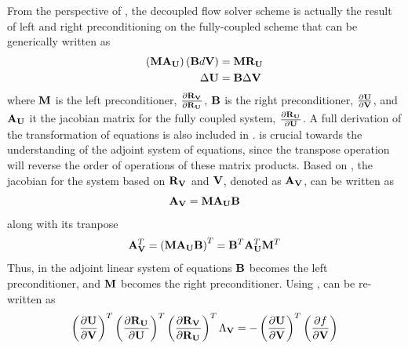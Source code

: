 From the perspective of , the decoupled flow solver scheme
is actually the result of left and right preconditioning on the fully-coupled
scheme that can be generically written as
\begin{equation}
  \begin{aligned}
    \left(\mathbf M \mathbf A_{\mathbf U} \right) \left( \mathbf B d\mathbf V \right) &= \mathbf M \mathbf R_{{\mathbf U}_{}} \\
    \Delta \mathbf U &= \mathbf B \Delta \mathbf V
  \end{aligned}
  \label{generic-fc-to-dc}
\end{equation}
where $\mathbf M$ is the left preconditioner, $\frac{\partial \mathbf R_{{\mathbf V}_{}}}{\partial \mathbf R_{{\mathbf U}_{}}}$, $\mathbf B$ is the right
preconditioner, $\frac{\partial \mathbf U}{\partial \mathbf V}$, and $\mathbf A_{\mathbf U}$ it the jacobian matrix for the
fully coupled system, $\frac{\partial \mathbf R_{{\mathbf U}_{}}}{\partial \mathbf U}$.  A full derivation of the
transformation of equations is also included in .
 is crucial towards the understanding of the adjoint
system of equations, since the transpose operation will reverse the order of
operations of these matrix products.  Based on , the
jacobian for the system based on $\mathbf R_{{\mathbf V}_{}}$ and $\mathbf V$, denoted as $\mathbf A_{\mathbf V}$, can
be written as
\begin{equation}
  \mathbf A_{\mathbf V} = \mathbf M \mathbf A_{\mathbf U} \mathbf B
  \label{adj-dc-generic}
\end{equation}
along with its tranpose
\begin{equation}
  \mathbf A_{\mathbf V}^{T}
   = \left( \mathbf M \mathbf A_{\mathbf U} \mathbf B \right)^{T}
   = \mathbf B^{T} \mathbf A_{\mathbf U}^{T} \mathbf M^{T}
  \label{adj-dc-generic-transpose}
\end{equation}
Thus, in the adjoint linear system of equations $\mathbf B$ becomes the left
preconditioner, and $\mathbf M$ becomes the right preconditioner.  Using
,  can be re-written as
\begin{equation}
  \left( \frac{\partial \mathbf U}{\partial \mathbf V} \right)^{T}
  \left(\frac{\partial \mathbf R_{{\mathbf U}_{}}}{\partial \mathbf U} \right)^{T} 
  \left( \frac{\partial \mathbf R_{{\mathbf V}_{}}}{\partial \mathbf R_{{\mathbf U}_{}}} \right)^{T}
  \Lambda_{\mathbf V} 
  = 
  - \left( \frac{\partial \mathbf U}{\partial \mathbf V} \right)^{T}
  \left( \frac{\partial f}{\partial \mathbf V} \right)
  \label{adj-u-to-v}
\end{equation}
